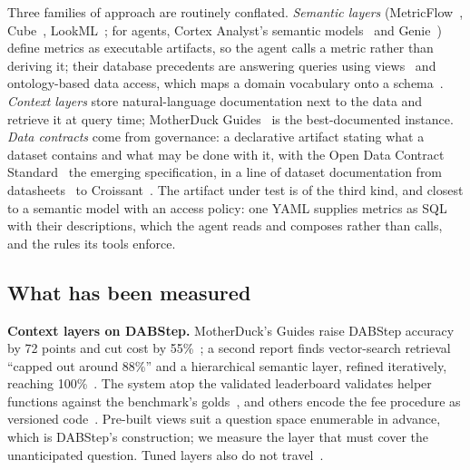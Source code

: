 Three families of approach are routinely conflated. \emph{Semantic layers}
(MetricFlow~\cite{metricflow}, Cube~\cite{cube},
LookML~\cite{lookml}; for agents, Cortex Analyst's semantic
models~\cite{cortex-analyst} and Genie~\cite{genie}) define metrics as
executable artifacts, so the agent calls a metric rather than deriving it;
their database precedents are answering queries using
views~\cite{halevy-views} and ontology-based data access, which maps a
domain vocabulary onto a schema~\cite{obda-survey}. \emph{Context layers} store
natural-language documentation next to the data and retrieve it at query
time; MotherDuck Guides~\cite{motherduck-guides} is the best-documented
instance. \emph{Data contracts} come from governance: a declarative
artifact stating what a dataset contains and what may be done with it,
with the Open Data Contract Standard~\cite{odcs} the emerging
specification\ifextended, in a line of dataset documentation from
datasheets~\cite{datasheets} to Croissant~\cite{croissant}\fi. The artifact under test is of the third kind, and closest to a semantic
model with an access policy: one YAML supplies metrics as SQL with their
descriptions, which the agent reads and composes rather than calls, and
the rules its tools enforce.

\subsection{What has been measured}
\label{sec:prior}

\textbf{Context layers on DABStep.} MotherDuck's Guides raise DABStep
accuracy by 72 points and cut cost by 55\%~\cite{motherduck-guides}; a
second report finds vector-search retrieval ``capped out around 88\%'' and
a hierarchical semantic layer, refined iteratively, reaching
100\%~\cite{motherduck-semantic}. The system atop the validated leaderboard
validates helper functions against the benchmark's
golds~\cite{nvidia-kgmon}, and others encode the fee procedure as
versioned code~\cite{oceanbase-datapilot}. \ifextended Pre-built views suit a question
space enumerable in advance, which is DABStep's construction; we measure
the layer that must cover the unanticipated question. \fi Tuned layers also
do not travel~\cite{evoontology}.

